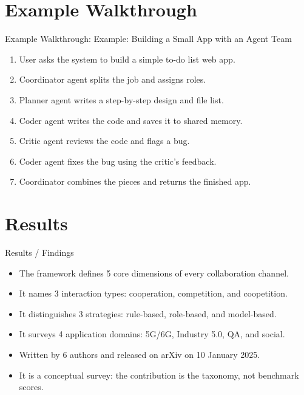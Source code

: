 \documentclass[10pt]{beamer}
\begin{document}
\section{Example Walkthrough}
\begin{frame}[allowframebreaks]{Example Walkthrough: Example: Building a Small App with an Agent Team}
\begin{enumerate}
  \item User asks the system to build a simple to-do list web app.
  \item Coordinator agent splits the job and assigns roles.
  \item Planner agent writes a step-by-step design and file list.
  \item Coder agent writes the code and saves it to shared memory.
  \item Critic agent reviews the code and flags a bug.
  \item Coder agent fixes the bug using the critic's feedback.
  \item Coordinator combines the pieces and returns the finished app.
\end{enumerate}
\end{frame}
\section{Results}
\begin{frame}[allowframebreaks]{Results / Findings}
\begin{itemize}
  \item The framework defines 5 core dimensions of every collaboration channel.
  \item It names 3 interaction types: cooperation, competition, and coopetition.
  \item It distinguishes 3 strategies: rule-based, role-based, and model-based.
  \item It surveys 4 application domains: 5G/6G, Industry 5.0, QA, and social.
  \item Written by 6 authors and released on arXiv on 10 January 2025.
  \item It is a conceptual survey: the contribution is the taxonomy, not benchmark scores.
\end{itemize}
\end{frame}
\end{document}

